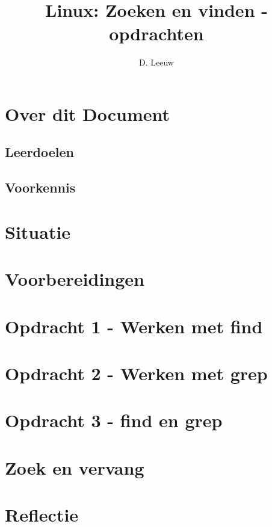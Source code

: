 \documentclass[a4paper,12pt,twoside,openright,titlepage]{article}
\author{D. Leeuw}
\title{Linux: Zoeken en vinden - opdrachten}
\date{\today\\
1.0.0\\
\vfill
\raggedright
\copyright\ 2026 Dennis Leeuw\\
}
\begin{document}

\maketitle


\section{Over dit Document}
\subsection{Leerdoelen}

\subsection{Voorkennis}



\section{Situatie}


\section{Voorbereidingen}


\section{Opdracht 1 - Werken met find}


\section{Opdracht 2 - Werken met grep}


\section{Opdracht 3 - find en grep}


\section{Zoek en vervang}


\section{Reflectie}



\printindex
\end{document}
